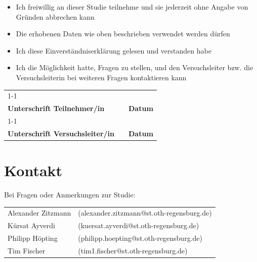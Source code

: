 \documentclass[a4paper, 12pt]{article}
\begin{document}
\begin{itemize}
    \item Ich freiwillig an dieser Studie teilnehme und sie jederzeit ohne Angabe von Gründen abbrechen kann
    \item Die erhobenen Daten wie oben beschrieben verwendet werden dürfen
    \item Ich diese Einverständniserklärung gelesen und verstanden habe
    \item Ich die Möglichkeit hatte, Fragen zu stellen, und den Versuchsleiter bzw. die Versuchsleiterin bei weiteren Fragen kontaktieren kann
\end{itemize}

\vspace{1.5cm}

\begin{tabularx}{\textwidth}{X c X}
    \cline{1-1} \cline{3-3} \\[-0.6em]
    \textbf{Unterschrift Teilnehmer/in} & \hspace{2cm} & \textbf{Datum} \\[2.5em]
    \cline{1-1} \cline{3-3} \\[-0.6em]
    \textbf{Unterschrift Versuchsleiter/in} & & \textbf{Datum} \\
\end{tabularx}

\vspace{1.5cm}

\section*{Kontakt}
Bei Fragen oder Anmerkungen zur Studie:

\medskip

\begin{tabular}{@{}ll}
    Alexander Zitzmann & (alexander.zitzmann@st.oth-regensburg.de) \\
    Kürsat Ayverdi & (kuersat.ayverdi@st.oth-regensburg.de) \\
    Philipp Höpting & (philipp.hoepting@st.oth-regensburg.de) \\
    Tim Fischer & (tim1.fischer@st.oth-regensburg.de)
\end{tabular}
\end{document}
